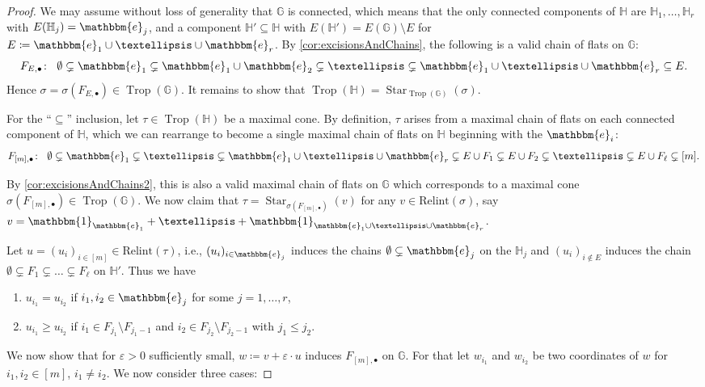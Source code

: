 \documentclass[10pt,a4paper]{amsart}
\DeclareMathOperator{\Star}{Star}
\DeclareMathOperator{\Trop}{Trop}
\newcommand{\GG}{\mathbb{G}}
\newcommand{\HH}{\mathbb{H}}
\newcommand{\bbone}{\mathbbm{1}}
\newcommand{\ee}{\mathbbm{e}}
\begin{document}
\begin{proof}
  We may assume without loss of generality that $\GG$ is connected, which means that the only connected components of $\HH$ are $\HH_1,\dots,\HH_r$ with $E(\HH_j)=\ee_j$, and a component $\HH'\subseteq\HH$ with $E(\HH')=E(\GG)\setminus E$ for $E\coloneqq \ee_1\cup\dots\cup\ee_r$.  By \cref{cor:excisionsAndChains}, the following is a valid chain of flats on $\GG$:
  \begin{equation*}
    F_{E,\bullet}\colon\;\; \emptyset\subsetneq \ee_1\subsetneq \ee_1\cup\ee_2\subsetneq\dots\subsetneq \ee_1\cup\dots\cup\ee_r \subseteq E.
  \end{equation*}
  Hence $\sigma=\sigma(F_{E,\bullet})\in\Trop(\GG)$.  It remains to show that $\Trop(\HH)=\Star_{\Trop(\GG)}(\sigma)$.
  
  For the ``$\subseteq$'' inclusion, let $\tau\in\Trop(\HH)$ be a maximal cone.  By definition, $\tau$ arises from a maximal chain of flats on each connected component of $\HH$, which we can rearrange to become a single maximal chain of flats on $\HH$ beginning with the $\ee_i$:
  \begin{equation*}
    F_{[m],\bullet}\colon\;\; \emptyset\subsetneq \ee_1\subsetneq \dots\subsetneq \ee_1\cup\dots\cup\ee_r\subsetneq E\cup F_1\subsetneq E\cup F_2\subsetneq\dots\subsetneq E\cup F_\ell\subsetneq [m].
  \end{equation*}

  By \cref{cor:excisionsAndChains2}, this is also a valid maximal chain of flats on $\GG$ which corresponds to a maximal cone $\sigma(F_{[m],\bullet})\in\Trop(\GG)$.  We now claim that $\tau=\Star_{\sigma(F_{[m],\bullet})}(v)$ for any $v\in\mathrm{Relint}(\sigma)$, say $v = \bbone_{\ee_1}+\dots+\bbone_{\ee_1\cup\dots\cup\ee_r}$.

  Let $u=(u_i)_{i\in[m]}\in \mathrm{Relint}(\tau)$, i.e., $(u_i)_{i\in\ee_j}$ induces the chains $\emptyset\subsetneq \ee_j$ on the $\HH_j$ and $(u_{i})_{i\notin E}$ induces the chain $\emptyset\subsetneq F_1\subsetneq \dots\subsetneq F_\ell$ on $\HH'$.  Thus we have
  \begin{enumerate}
  \item $u_{i_1}=u_{i_2}$ if $i_1,i_2\in\ee_j$ for some $j=1,\dots,r$,
  \item $u_{i_1}\geq u_{i_2}$ if $i_1\in F_{j_1}\setminus F_{j_1-1}$ and $i_2\in F_{j_2}\setminus F_{j_2-1}$ with $j_1\leq j_2$.
  \end{enumerate}
  We now show that for $\varepsilon>0$ sufficiently small, $w\coloneqq v+\varepsilon\cdot u$ induces $F_{[m],\bullet}$ on $\GG$.
  For that let $w_{i_1}$ and $w_{i_2}$ be two coordinates of $w$ for $i_1, i_2\in [m]$, $i_1\neq i_2$.  We now consider three cases:


\end{proof}
\end{document}

